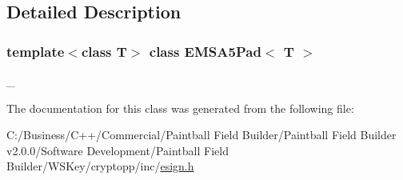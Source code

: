 \subsection{Detailed Description}
\subsubsection*{template$<$class T$>$ class EMSA5Pad$<$ T $>$}

\_\- 

The documentation for this class was generated from the following file:\begin{DoxyCompactItemize}
\item 
C:/Business/C++/Commercial/Paintball Field Builder/Paintball Field Builder v2.0.0/Software Development/Paintball Field Builder/WSKey/cryptopp/inc/\hyperlink{esign_8h}{esign.h}\end{DoxyCompactItemize}
